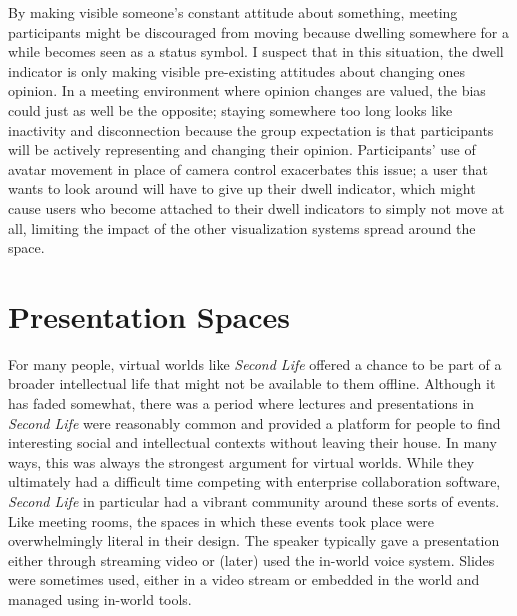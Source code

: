 By making visible someone's constant attitude about something, meeting participants might be discouraged from moving because dwelling somewhere for a while becomes seen as a status symbol. I suspect that in this situation, the dwell indicator is only making visible pre-existing attitudes about changing ones opinion. In a meeting environment where opinion changes are valued, the bias could just as well be the opposite; staying somewhere too long looks like inactivity and disconnection because the group expectation is that participants will be actively representing and changing their opinion. Participants' use of avatar movement in place of camera control exacerbates this issue; a user that wants to look around will have to give up their dwell indicator, which might cause users who become attached to their dwell indicators to simply not move at all, limiting the impact of the other visualization systems spread around the space. 




\section{Presentation Spaces}


For many people, virtual worlds like \emph{Second Life} offered a chance to be part of a broader intellectual life that might not be available to them offline. Although it has faded somewhat, there was a period where lectures and presentations in \emph{Second Life} were reasonably common and provided a platform for people to find interesting social and intellectual contexts without leaving their house. In many ways, this was always the strongest argument for virtual worlds. While they ultimately had a difficult time competing with enterprise collaboration software, \emph{Second Life} in particular had a vibrant community around these sorts of events. Like meeting rooms, the spaces in which these events took place were overwhelmingly literal in their design.  The speaker typically gave a presentation either through streaming video or (later) used the in-world voice system. Slides were sometimes used, either in a video stream or embedded in the world and managed using in-world tools.

